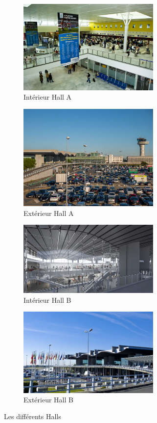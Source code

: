 \begin{figure}[hbt!]
    \begin{subfigure}{0.5\textwidth}
      \centering
      \includegraphics[width=7cm]{Images/inthalla.jpg}  
      \caption{Intérieur Hall A}
      \label{fig:inthalla}
    \end{subfigure}
    \begin{subfigure}{0.5\textwidth}
      \centering
      \includegraphics[width=7cm]{Images/exthalla.jpg}  
      \caption{Extérieur Hall A}
      \label{fig:exthalla}
    \end{subfigure}
        
    \begin{subfigure}{.5\textwidth}
      \centering
      \includegraphics[width=7cm]{Images/inthallb.jpg}  
      \caption{Intérieur Hall B}
      \label{fig:inthallb}
    \end{subfigure}
    \begin{subfigure}{.5\textwidth}
      \centering
      \includegraphics[width=7cm]{Images/exthallb.jpg}  
      \caption{Extérieur Hall B}
      \label{fig:exthallb}
    \end{subfigure}
    \caption{Les différents Halls}
    \label{fig:halls}
\end{figure}

